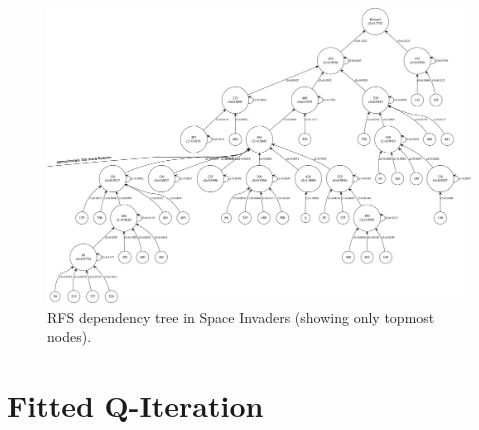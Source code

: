 \begin{figure}
    \includegraphics[width=\textwidth]{pictures/experiments/rfs_tree_top_pong}
    \centering
    \caption[RFS dependency tree in Space Invaders]{RFS dependency tree in Space 
	     Invaders (showing only topmost nodes).}
    \label{f:rfs_tree_space_invaders}
\end{figure}
%
\section{Fitted Q-Iteration}



